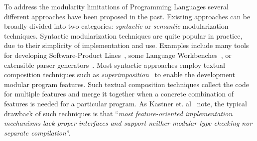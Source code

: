 \begin{comment}
Most programming languages share alot of features in
common. 

For example, most languages have language constructs for:
binding (such as variables, functions, and function applications);
basic arithmetic operations; basic logic and conditional operations;
loops; as well as various other features. For each language construct,
various operations (such as evaluation, compilation, or parsing) need
to be implemented. It is reasonable to wonder whether we can simply
implement those features independently of a particular implementation
of a programming language. Evaluation could be defined independently 
for binding and arithmetic constructs. If the language to be
implemented is the pure lambda calculus, only evaluation of binding 
constructs is necessary. Thus only the component that implements 
evaluation for binding needs to be used in such an implementation.
However, more realistic programming languages 
will include arithmetic constructs, and will require an evaluation
function for those. 


Then it would be possible to \emph{reuse}
some of those features in \emph{multiple} different implementations of
programming languages. Essentially, this would enable a SPL for
programming languages, where all

A solution to the Expression Problem could ena



A concrete 
example that illustrates this issue is 
\end{comment}

To address the modularity limitations of Programming Languages several
different approaches have been proposed in the past. Existing
approaches can be broadly divided into two categories:
\emph{syntactic} or \emph{semantic} modularization
techniques. Syntactic modularization techniques are quite popular in
practice, due to their simplicity of implementation and use. 
Examples include many tools for developing Software-Product
Lines~\cite{}, some Language Workbenches~\cite{}, or extensible parser
generators~\cite{}.  Most syntactic approaches employ textual
composition techniques such as \emph{superimposition}~\cite{} to
enable the development modular program features. Such textual
composition techniques collect the code for multiple features and
merge it together when a concrete combination of features is needed
for a particular program. As Kastner et. al~\cite{Kastner11road} note, the typical
drawback of such techniques is that
``\emph{most feature-oriented implementation mechanisms lack proper
  interfaces and support neither modular type checking nor separate
  compilation}''. 

